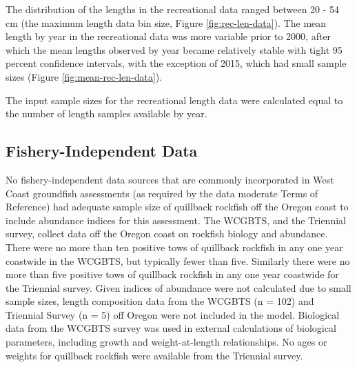 \documentclass[11pt,
  english,
  a4paper,
]{article}
\begin{document}
\leavevmode\tagmcend\tagstructend\par


The distribution of the lengths in the recreational data ranged between 20 - 54 cm (the maximum length data bin size, Figure \ref{fig:rec-len-data}). The mean length by year in the recreational data was more variable prior to 2000, after which the mean lengths observed by year became relatively stable with tight 95 percent confidence intervals, with the exception of 2015, which had small sample sizes (Figure \ref{fig:mean-rec-len-data}).

\leavevmode\tagmcend\tagstructend\par


The input sample sizes for the recreational length data were calculated equal to the number of length samples available by year.

\leavevmode\tagmcend\tagstructend\par


\hypertarget{fishery-independent-data}{%
\subsection{Fishery-Independent Data}\label{fishery-independent-data}}

\leavevmode\tagmcend\tagstructend


No fishery-independent data sources that are commonly incorporated in West Coast groundfish assessments (as required by the data moderate Terms of Reference) had adequate sample size of quillback rockfish off the Oregon coast to include abundance indices for this assessment. The WCGBTS, and the Triennial survey, collect data off the Oregon coast on rockfish biology and abundance. There were no more than ten positive tows of quillback rockfish in any one year coastwide in the WCGBTS, but typically fewer than five. Similarly there were no more than five positive tows of quillback rockfish in any one year coastwide for the Triennial survey. Given indices of abundance were not calculated due to small sample sizes, length composition data from the WCGBTS (n = 102) and Triennial Survey (n = 5) off Oregon were not included in the model. Biological data from the WCGBTS survey was used in external calculations of biological parameters, including growth and weight-at-length relationships. No ages or weights for quillback rockfish were available from the Triennial survey.
\end{document}
